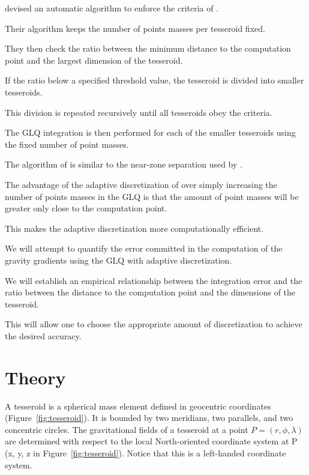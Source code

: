 \documentclass[manuscript]{geophysics}
\begin{document}
\citet{Li2011} devised an automatic algorithm to enforce the criteria of
\citet{Ku1977}.

Their algorithm keeps the number of points masses per tesseroid fixed.

They then check the ratio between the minimum distance to the computation point
and the largest dimension of the tesseroid.

If the ratio below a specified threshold value, the tesseroid is divided into
smaller tesseroids.

This division is repeated recursively until all tesseroids obey the criteria.

The GLQ integration is then performed for each of the smaller tesseroids
using the fixed number of point masses.

The algorithm of \citet{Li2011} is similar to the near-zone separation used by
\citet{Grombein2013}.

The advantage of the adaptive discretization of \citet{Li2011} over simply
increasing the number of points masses in the GLQ is that the
amount of point masses will be greater only close to the computation point.

This makes the adaptive discretization more computationally efficient.


We will attempt to quantify the error committed in the computation of the
gravity gradients using the GLQ with adaptive discretization.

We will establish an empirical relationship between the integration error and
the ratio between the distance to the computation point and the dimensions of
the tesseroid.

This will allow one to choose the appropriate amount of discretization to
achieve the desired accuracy.


\section{Theory}

A tesseroid is a spherical mass element defined in geocentric coordinates
(Figure~\ref{fig:tesseroid}).
It is bounded by two meridians, two parallels, and two concentric circles.
The gravitational fields of a tesseroid at a point $P = (r,\phi,\lambda)$
are determined with respect to the local North-oriented coordinate system at
P (x, y, z in Figure~\ref{fig:tesseroid}).
Notice that this is a left-handed coordinate system.
\end{document}

